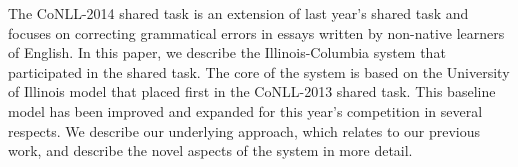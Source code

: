 The CoNLL-2014 shared task is an extension of last year's shared task and focuses on correcting grammatical errors in essays written by non-native learners of English.  In this paper, we describe the Illinois-Columbia system that participated in the shared task. The core of the system is based on the University of Illinois model that placed first in the CoNLL-2013 shared task. This baseline model has been improved and expanded for this year's competition in several respects. We describe our underlying approach, which relates to our previous work, and describe the novel aspects of the system in more detail.
